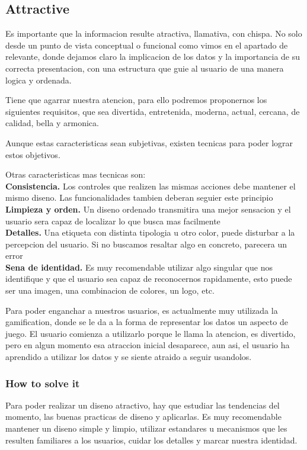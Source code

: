 \subsection{Attractive}
Es importante que la informacion resulte atractiva, llamativa, con chispa. No solo desde un punto de vista conceptual
o funcional como vimos en el apartado de relevante, donde dejamos claro la implicacion de los datos y la importancia
de su correcta presentacion, con una estructura que guie al usuario de una manera logica y ordenada.

Tiene que agarrar nuestra atencion, para ello podremos proponernos los siguientes requisitos, que sea divertida, entretenida,
moderna, actual, cercana, de calidad, bella y armonica.

Aunque estas caracteristicas sean subjetivas, existen tecnicas para poder lograr estos objetivos.

Otras caracteristicas mas tecnicas son:\\
 
\textbf{Consistencia.} Los controles que realizen las mismas acciones debe mantener el mismo diseno. Las funcionalidades
tambien deberan seguier este principio\\

\textbf{Limpieza y orden.} Un diseno ordenado transmitira una mejor sensacion y el usuario sera capaz de localizar lo que busca
mas facilmente\\

\textbf{Detalles.} Una etiqueta con distinta tipologia u otro color, puede disturbar a la percepcion del usuario. Si no 
buscamos resaltar algo en concreto, parecera un error \\

\textbf{Sena de identidad.} Es muy recomendable utilizar algo singular que nos identifique y que el usuario sea capaz 
de reconocernos rapidamente, esto puede ser una imagen, una combinacion de colores, un logo, etc.

Para poder enganchar a nuestros usuarios, es actualmente muy utilizada la gamification, donde se le da a la forma de 
representar los datos un aspecto de juego. El usuario comienza a utilizarlo porque le llama la atencion, es divertido,
pero en algun momento esa atraccion inicial desaparece, aun asi, el usuario ha aprendido a utilizar los datos y 
se siente atraido a seguir usandolos.

\subsubsection{How to solve it} 
Para poder realizar un diseno atractivo, hay que estudiar las tendencias del momento, las buenas practicas de diseno y aplicarlas.
Es muy recomendable mantener un diseno simple y limpio, utilizar estandares u mecanismos que les resulten familiares a los usuarios,
cuidar los detalles y marcar nuestra identidad.


